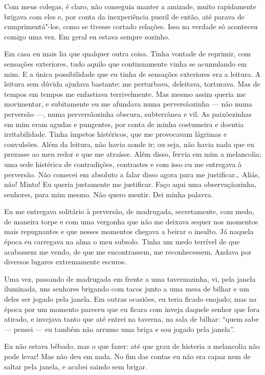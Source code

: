 Com meus colegas, é claro, não conseguia manter a amizade, muito
rapidamente brigava com eles e, por conta da inexperiência pueril de
então, até parava de cumprimentá"-los, como se tivesse cortado relações.
Isso na verdade só aconteceu comigo uma vez. Em geral eu estava sempre
sozinho.

Em casa eu mais lia que qualquer outra coisa. Tinha vontade de reprimir,
com sensações exteriores, tudo aquilo que continuamente vinha se
acumulando em mim. E a única possibilidade que eu tinha de sensações
exteriores era a leitura. A leitura sem dúvida ajudava bastante: me
perturbava, deleitava, torturava. Mas de tempos em tempos me enfastiava
terrivelmente. Mas mesmo assim queria me movimentar, e subitamente eu
me afundava numa perversãozinha --- não numa perversão ---, numa
perversãozinha obscura, subterrânea e vil. As paixõezinhas em mim eram
agudas e pungentes, por conta de minha costumeira e doentia
irritabilidade. Tinha ímpetos histéricos, que me provocavam lágrimas e
convulsões. Além da leitura, não havia aonde ir; ou seja, não havia
nada que eu prezasse ao meu redor e que me atraísse. Além disso, fervia
em mim a melancolia; uma sede histérica de contradições, contrastes e
com isso eu me entregava à perversão. Não comecei em absoluto a falar
disso agora para me justificar\ldots{} Aliás, não! Minto! Eu queria
justamente me justificar. Faço aqui uma observaçãozinha, senhores, para
mim mesmo. Não quero mentir. Dei minha palavra.

Eu me entregava solitário à perversão, de madrugada, secretamente, com
medo, de maneira torpe e com uma vergonha que não me deixava sequer nos
momentos mais repugnantes e que nesses momentos chegava a beirar o
insulto. Já naquela época eu carregava na alma o meu subsolo. Tinha um
medo terrível de que acabassem me vendo, de que me encontrassem, me
reconhecessem. Andava por diversos lugares extremamente escuros.

Uma vez, passando de madrugada em frente a uma tavernazinha, vi, pela
janela iluminada, uns senhores brigando com tacos junto a uma mesa de
bilhar e um deles ser jogado pela janela. Em outras ocasiões, eu teria
ficado enojado; mas na época por um momento pareceu que eu ficara com
inveja daquele senhor que fora atirado, e invejava tanto que até entrei
na taverna, na sala de bilhar: “quem sabe --- pensei --- eu também não
arrumo uma briga e sou jogado pela janela”.

Eu não estava bêbado, mas o que fazer: até que grau de histeria a
melancolia não pode levar! Mas não deu em nada. No fim das contas eu
não era capaz nem de saltar pela janela, e acabei saindo sem brigar.

